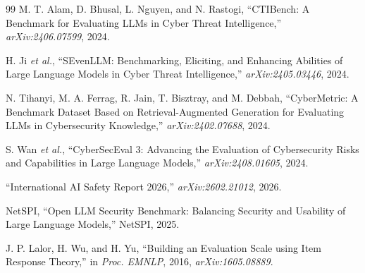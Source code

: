 \documentclass[10pt,twocolumn]{article}
\begin{document}
\begin{thebibliography}{99}
 M. T. Alam, D. Bhusal, L. Nguyen, and N. Rastogi,
``CTIBench: A Benchmark for Evaluating LLMs in Cyber Threat
Intelligence,'' \textit{arXiv:2406.07599}, 2024.

 H. Ji \textit{et al.}, ``SEvenLLM: Benchmarking,
Eliciting, and Enhancing Abilities of Large Language Models in Cyber
Threat Intelligence,'' \textit{arXiv:2405.03446}, 2024.

 N. Tihanyi, M. A. Ferrag, R. Jain, T. Bisztray,
and M. Debbah, ``CyberMetric: A Benchmark Dataset Based on
Retrieval-Augmented Generation for Evaluating LLMs in Cybersecurity
Knowledge,'' \textit{arXiv:2402.07688}, 2024.

 S. Wan \textit{et al.}, ``CyberSecEval 3:
Advancing the Evaluation of Cybersecurity Risks and Capabilities in
Large Language Models,'' \textit{arXiv:2408.01605}, 2024.

 ``International AI Safety Report 2026,''
\textit{arXiv:2602.21012}, 2026.

 NetSPI, ``Open LLM Security Benchmark: Balancing
Security and Usability of Large Language Models,'' NetSPI, 2025.

 J. P. Lalor, H. Wu, and H. Yu, ``Building an
Evaluation Scale using Item Response Theory,'' in \textit{Proc. EMNLP},
2016, \textit{arXiv:1605.08889}.

\end{thebibliography}
\end{document}

